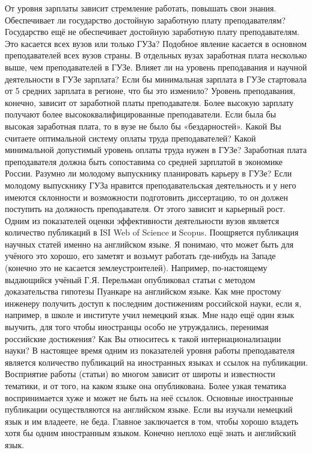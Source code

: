 \begin{drama}
	\michaelspeaks От уровня зарплаты зависит стремление работать, повышать свои знания.
	\maxspeaks Обеспечивает ли государство достойную заработную плату преподавателям? 
	\michaelspeaks Государство ещё не обеспечивает достойную заработную плату преподавателям. 
	\maxspeaks Это касается всех вузов или только ГУЗа?
	\michaelspeaks Подобное явление касается в основном преподавателей всех вузов страны. В отдельных вузах заработная плата несколько выше, чем преподавателей в ГУЗе.
	\maxspeaks Влияет ли на уровень преподавания и научной деятельности в ГУЗе зарплата? Если бы минимальная зарплата в ГУЗе стартовала от 5 средних зарплата в регионе, что бы это изменило?
	\michaelspeaks Уровень преподавания, конечно, зависит от заработной платы преподавателя. Более высокую зарплату получают более высококвалифицированные преподаватели. Если была бы высокая заработная плата, то в вузе не было бы «бездарностей».
	\maxspeaks Какой Вы считаете оптимальной систему оплаты труда преподавателей? Какой минимальной допустимый уровень оплаты труда нужен в ГУЗе?
	\michaelspeaks Заработная плата преподавателя должна быть сопоставима со средней зарплатой в экономике России.
	\maxspeaks Разумно ли молодому выпускнику планировать карьеру в ГУЗе?
	\michaelspeaks Если молодому выпускнику ГУЗа нравится преподавательская деятельность и у него имеются склонности и возможности подготовить диссертацию, то он должен поступить на должность преподавателя. От этого зависит и карьерный рост.
	\maxspeaks Одним из показателей оценки эффективности деятельности вузов является количество публикаций в ISI Web of Science и Scopus. Поощряется публикация научных статей именно на английском языке. Я понимаю, что может быть для учёного это хорошо, его заметят и возьмут работать где-нибудь на Западе (конечно это не касается землеустроителей). Например, по-настоящему выдающийся учёный Г.Я. Перельман опубликовал статьи с методом доказательства гипотезы Пуанкаре на английском языке. Как мне простому инженеру получить доступ к последним достижениям российской науки, если я, например, в школе и институте учил немецкий язык. Мне надо ещё один язык выучить, для того чтобы иностранцы особо не утруждались, перенимая российские достижения? Как Вы относитесь к такой интернационализации науки?
	\michaelspeaks В настоящее время одним из показателей уровня работы преподавателя является количество публикаций на иностранных языках и ссылок на публикации. Восприятие работы (статьи) во многом зависит от широты и известности тематики, и от того, на каком языке она опубликована. Более узкая тематика воспринимается хуже и может не быть на неё ссылок. Основные иностранные публикации осуществляются на английском языке. Если вы изучали немецкий язык и им владеете, не беда. Главное заключается в том, чтобы хорошо владеть хотя бы одним иностранным языком. Конечно неплохо ещё знать и английский язык.

\end{drama}
